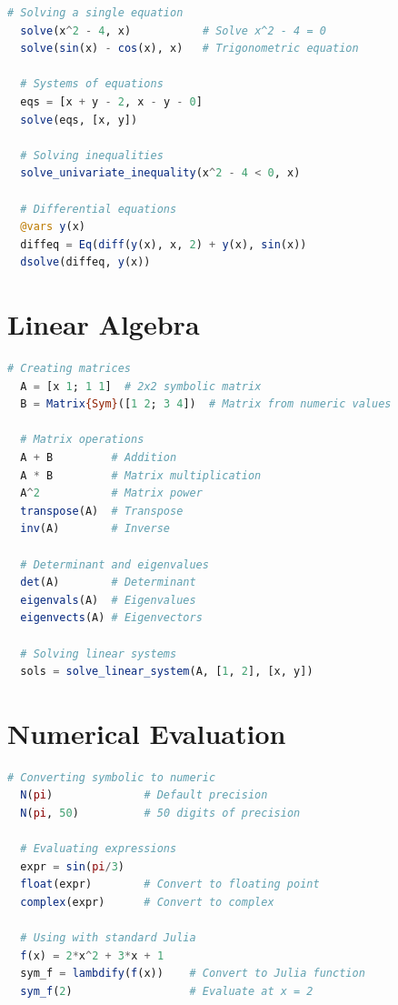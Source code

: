 \documentclass[12pt,answers]{book}
\begin{document}
\begin{lstlisting}[language=Julia]
  # Solving a single equation
  solve(x^2 - 4, x)           # Solve x^2 - 4 = 0
  solve(sin(x) - cos(x), x)   # Trigonometric equation

  # Systems of equations
  eqs = [x + y - 2, x - y - 0]
  solve(eqs, [x, y])

  # Solving inequalities
  solve_univariate_inequality(x^2 - 4 < 0, x)

  # Differential equations
  @vars y(x)
  diffeq = Eq(diff(y(x), x, 2) + y(x), sin(x))
  dsolve(diffeq, y(x))
\end{lstlisting}

\clearpage
\section{Linear Algebra}

\begin{lstlisting}[language=Julia]
  # Creating matrices
  A = [x 1; 1 1]  # 2x2 symbolic matrix
  B = Matrix{Sym}([1 2; 3 4])  # Matrix from numeric values

  # Matrix operations
  A + B         # Addition
  A * B         # Matrix multiplication
  A^2           # Matrix power
  transpose(A)  # Transpose
  inv(A)        # Inverse

  # Determinant and eigenvalues
  det(A)        # Determinant
  eigenvals(A)  # Eigenvalues
  eigenvects(A) # Eigenvectors

  # Solving linear systems
  sols = solve_linear_system(A, [1, 2], [x, y])
\end{lstlisting}

\section{Numerical Evaluation}

\begin{lstlisting}[language=Julia]
  # Converting symbolic to numeric
  N(pi)              # Default precision
  N(pi, 50)          # 50 digits of precision

  # Evaluating expressions
  expr = sin(pi/3)
  float(expr)        # Convert to floating point
  complex(expr)      # Convert to complex

  # Using with standard Julia
  f(x) = 2*x^2 + 3*x + 1
  sym_f = lambdify(f(x))    # Convert to Julia function
  sym_f(2)                  # Evaluate at x = 2
\end{lstlisting}
\end{document}
